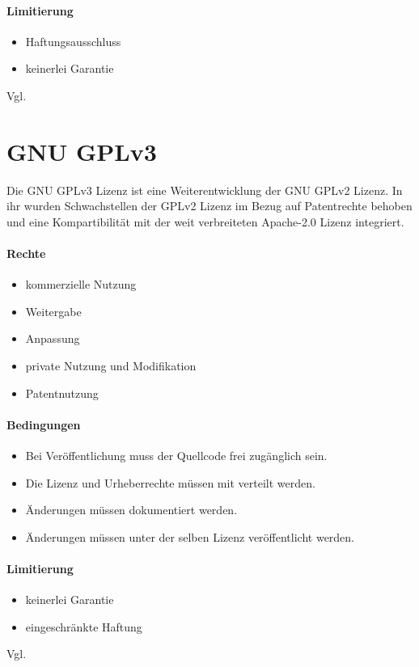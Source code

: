 \paragraph{Limitierung}
\begin{itemize}
    \item Haftungsausschluss
    \item keinerlei Garantie
\end{itemize}
Vgl. \cite{choosealicense-com}

\section{GNU GPLv3}\label{sec:gnu-gplv3}
Die GNU GPLv3 Lizenz ist eine Weiterentwicklung der GNU GPLv2 Lizenz. In ihr wurden Schwachstellen der
GPLv2 Lizenz im Bezug auf Patentrechte behoben und eine Kompartibilität mit der weit verbreiteten
Apache-2.0 Lizenz integriert.

\paragraph{Rechte}
\begin{itemize}
    \item kommerzielle Nutzung
    \item Weitergabe
    \item Anpassung
    \item private Nutzung und Modifikation
    \item Patentnutzung
\end{itemize}
\paragraph{Bedingungen}
\begin{itemize}
    \item Bei Veröffentlichung muss der Quellcode frei zugänglich sein.
    \item Die Lizenz und Urheberrechte müssen mit verteilt werden.
    \item Änderungen müssen dokumentiert werden.
    \item Änderungen müssen unter der selben Lizenz veröffentlicht werden.
\end{itemize}

\paragraph{Limitierung}
\begin{itemize}
    \item keinerlei Garantie
    \item eingeschränkte Haftung
\end{itemize}
Vgl. \cite{choosealicense-com}

